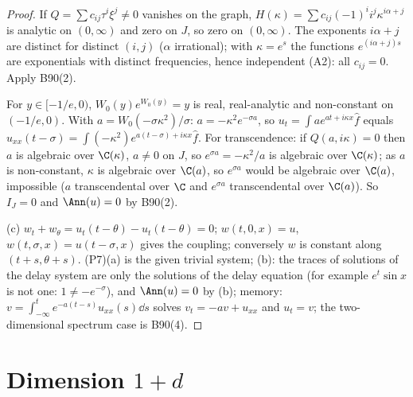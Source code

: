 \begin{proof}
If $Q=\sum c_{ij}\tau^i\xi^j\ne0$ vanishes on the graph, $H(\kappa)=\sum c_{ij}(-1)^ii^j\kappa^{i\alpha+j}$ is analytic on $(0,\infty)$ and zero on $J$, so zero on $(0,\infty)$. The exponents $i\alpha+j$ are distinct for distinct $(i,j)$ ($\alpha$ irrational); with $\kappa=e^s$ the functions $e^{(i\alpha+j)s}$ are exponentials with distinct frequencies, hence independent (A2): all $c_{ij}=0$. Apply B90(2).

For $y\in[-1/e,0)$, $W_0(y)e^{W_0(y)}=y$ is real, real-analytic and non-constant on $(-1/e,0)$. With $a=W_0(-\sigma\kappa^2)/\sigma$: $a=-\kappa^2e^{-\sigma a}$, so $u_t=\int ae^{at+i\kappa x}\hat f$ equals $u_{xx}(t-\sigma)=\int(-\kappa^2)e^{a(t-\sigma)+i\kappa x}\hat f$. For transcendence: if $Q(a,i\kappa)=0$ then $a$ is algebraic over $\C(\kappa)$, $a\ne0$ on $J$, so $e^{\sigma a}=-\kappa^2/a$ is algebraic over $\C(\kappa)$; as $a$ is non-constant, $\kappa$ is algebraic over $\C(a)$, so $e^{\sigma a}$ would be algebraic over $\C(a)$, impossible ($a$ transcendental over $\C$ and $e^{\sigma a}$ transcendental over $\C(a)$). So $I_J=0$ and $\Ann(u)=0$ by B90(2).

(c) $w_t+w_\theta=u_t(t-\theta)-u_t(t-\theta)=0$; $w(t,0,x)=u$, $w(t,\sigma,x)=u(t-\sigma,x)$ gives the coupling; conversely $w$ is constant along $(t+s,\theta+s)$. (P7)(a) is the given trivial system; (b): the traces of solutions of the delay system are only the solutions of the delay equation (for example $e^t\sin x$ is not one: $1\ne-e^{-\sigma}$), and $\Ann(u)=0$ by (b); memory: $v=\int_{-\infty}^te^{-a(t-s)}u_{xx}(s)\dd s$ solves $v_t=-av+u_{xx}$ and $u_t=v$; the two-dimensional spectrum case is B90(4).

\end{proof}

\section{Dimension $1+d$}


